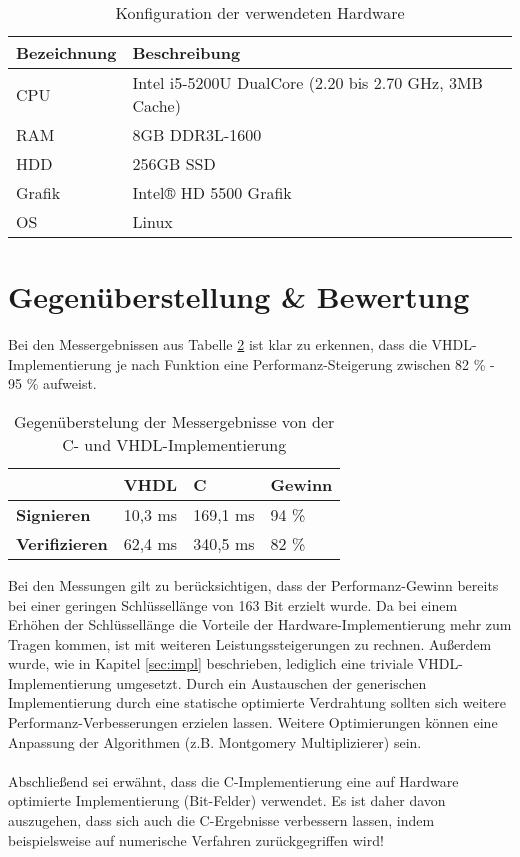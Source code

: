 \begin{table}
	\centering 
	\begin{tabular}{ | l | l | }
		\hline
		Bezeichnung & Beschreibung \\
		\hline
		CPU & Intel i5-5200U DualCore (2.20 bis 2.70 GHz, 3MB Cache) \\ 
		RAM & 8GB DDR3L-1600 \\
		HDD & 256GB SSD  \\
		Grafik & Intel® HD 5500 Grafik \\
		OS & Linux \\
		\hline
	\end{tabular}
	\caption{Konfiguration der verwendeten Hardware}
	\label{c-impl-hardware}
\end{table}


\section{Gegenüberstellung \& Bewertung}

Bei den Messergebnissen aus Tabelle \ref{messung-results} ist klar zu erkennen, dass die VHDL-Implementierung je nach Funktion eine Performanz-Steigerung zwischen 82 \% - 95 \% aufweist. \\

\begin{table} [h]
	\centering 
	\begin{tabular}{ | p{3cm} | p{2cm} | p{2cm} | p{2cm} | }
		\hline
		 & \textbf{VHDL} & \textbf{C} & \textbf{Gewinn} \\
		\hline
		\textbf{Signieren} & 10,3 ms & 169,1 ms & 94 \% \\
		\hline
		\textbf{Verifizieren} &  62,4 ms & 340,5 ms & 82 \% \\
		\hline
	\end{tabular}
	\caption{Gegenüberstelung der Messergebnisse von der C- und VHDL-Implementierung}
	\label{messung-results}
\end{table}

Bei den Messungen gilt zu berücksichtigen, dass der Performanz-Gewinn bereits bei einer geringen Schlüssellänge von 163 Bit erzielt wurde. Da bei einem Erhöhen der Schlüssellänge die Vorteile der Hardware-Implementierung mehr zum Tragen kommen, ist mit weiteren Leistungssteigerungen zu rechnen. Außerdem wurde, wie in Kapitel \ref{sec:impl} beschrieben, lediglich eine triviale VHDL-Implementierung umgesetzt. Durch ein Austauschen der generischen Implementierung durch eine statische optimierte Verdrahtung sollten sich weitere Performanz-Verbesserungen erzielen lassen. Weitere Optimierungen können eine Anpassung der Algorithmen (z.B. Montgomery Multiplizierer) sein.
\\ \\
Abschließend sei erwähnt, dass die C-Implementierung \cite{kewish} eine auf Hardware optimierte Implementierung (Bit-Felder) verwendet. Es ist daher davon auszugehen, dass sich auch die C-Ergebnisse verbessern lassen, indem beispielsweise auf numerische Verfahren zurückgegriffen wird!  

